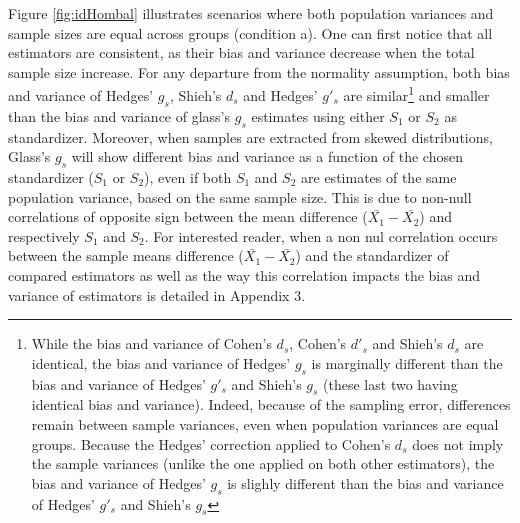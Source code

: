 \documentclass[
  man,floatsintext]{apa6}
\begin{document}
Figure \ref{fig:idHombal} illustrates scenarios where both population variances and sample sizes are equal across groups (condition a). One can first notice that all estimators are consistent, as their bias and variance decrease when the total sample size increase. For any departure from the normality assumption, both bias and variance of Hedges' \(g_s\), Shieh's \(d_s\) and Hedges' \(g'_s\) are similar\footnote{While the bias and variance of Cohen's $d_s$, Cohen's $d'_s$ and Shieh's $d_s$ are identical, the bias and variance of Hedges' $g_s$ is marginally different than the bias and variance of Hedges' $g'_s$ and Shieh's $g_s$ (these last two having identical bias and variance). Indeed, because of the sampling error, differences remain between sample variances, even when population variances are equal groups. Because the Hedges' correction applied to Cohen's $d_s$ does not imply the sample variances (unlike the one applied on both other estimators), the bias and variance of Hedges' $g_s$ is slighly different than the bias and variance of Hedges' $g'_s$ and Shieh's $g_s$} and smaller than the bias and variance of glass's \(g_s\) estimates using either \(S_1\) or \(S_2\) as standardizer. Moreover, when samples are extracted from skewed distributions, Glass's \(g_s\) will show different bias and variance as a function of the chosen standardizer (\(S_1\) or \(S_2\)), even if both \(S_1\) and \(S_2\) are estimates of the same population variance, based on the same sample size. This is due to non-null correlations of opposite sign between the mean difference (\(\bar{X_1}-\bar{X_2}\)) and respectively \(S_1\) and \(S_2\). For interested reader, when a non nul correlation occurs between the sample means difference (\(\bar{X_1}-\bar{X_2}\)) and the standardizer of compared estimators as well as the way this correlation impacts the bias and variance of estimators is detailed in Appendix 3.
\end{document}
